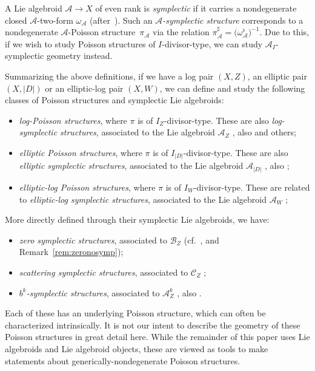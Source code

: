 \documentclass[pdftex]{sigma}
\numberwithin{equation}{section}
\begin{document}
A Lie algebroid $\mathcal{A} \to X$ of even rank is \emph{symplectic} if it carries a nondegenerate closed $\mathcal{A}$-two-form $\omega_\mathcal{A}$ (after~\cite{NestTsygan01}). Such an \emph{$\mathcal{A}$-symplectic structure} corresponds to a nondegenerate $\mathcal{A}$-Poisson structure~$\pi_{\mathcal{A}}$ via the relation $\pi_\mathcal{A}^\sharp = \big(\omega_\mathcal{A}^\flat\big)^{-1}$. Due to this, if we wish to study Poisson structures of $I$-divisor-type, we can study $\mathcal{A}_I$-symplectic geometry instead.

Summarizing the above definitions, if we have a log pair $(X,Z)$, an elliptic pair $(X,|D|)$ or an elliptic-log pair $(X,W)$, we can define and study the following classes of Poisson structures and symplectic Lie algebroids:
\begin{itemize}\itemsep=0pt
\item \emph{log-Poisson structures}, where $\pi$ is of $I_Z$-divisor-type. These are also \emph{log-symplectic structures}, associated to the Lie algebroid $\mathcal{A}_Z$ \cite{GuilleminMirandaPires14, MarcutOsornoTorres14two}, also \cite{Cavalcanti17,GualtieriLi14, MarcutOsornoTorres14} and others;
\item \emph{elliptic Poisson structures}, where $\pi$ is of $I_{|D|}$-divisor-type. These are also \emph{elliptic symplectic structures}, associated to the Lie algebroid $\mathcal{A}_{|D|}$ \cite{CavalcantiGualtieri18}, also \cite{CavalcantiKlaasse18};
\item \emph{elliptic-log Poisson structures}, where $\pi$ is of $I_{W}$-divisor-type. These are related to \emph{elliptic-log symplectic structures}, associated to the Lie algebroid $\mathcal{A}_W$ \cite{Klaasse18};
\end{itemize}
More directly defined through their symplectic Lie algebroids, we have:
\begin{itemize}\itemsep=0pt
\item \emph{zero symplectic structures}, associated to $\mathcal{B}_Z$ (cf.\ \cite{Lanius16}, and Remark~\ref{rem:zeronosymp});
\item \emph{scattering symplectic structures}, associated to $\mathcal{C}_Z$ \cite{Lanius16};
\item \emph{$b^k$-symplectic structures}, associated to $\mathcal{A}_Z^k$ \cite{Scott16}, also \cite{GuilleminMirandaWeitsman17}.
\end{itemize}
Each of these has an underlying Poisson structure, which can often be characterized intrinsically. It is not our intent to describe the geometry of these Poisson structures in great detail here. While the remainder of this paper uses Lie algebroids and Lie algebroid objects, these are viewed as tools to make statements about generically-nondegenerate Poisson structures.
\end{document}
